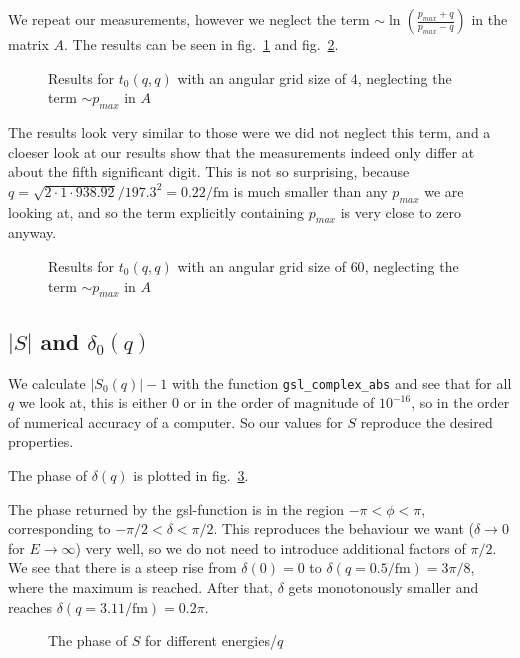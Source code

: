\documentclass{scrartcl}
\begin{document}
We repeat our measurements, however we neglect the term $\sim \ln\left(\frac{p_{max}+q}{p_{max}-q}\right)$ in the matrix $A$. The results can be seen in fig.~\ref{fig:tnnsmallangsizewopm} and fig.~\ref{fig:tnnbigangsizewopm}. 

\begin{figure}[htbp]
	
	\caption{Results for $t_0(q,q)$ with an angular grid size of $4$, neglecting the term $\sim p_{max}$ in $A$}
	\label{fig:tnnsmallangsizewopm}
\end{figure}

The results look very similar to those were we did not neglect this term, and a cloeser look at our results show that the measurements indeed only differ at about the fifth significant digit. This is not so surprising, because $q=\sqrt{2\cdot1\cdot 938.92}/197.3^2=0.22\si{\per\femto\meter}$ is much smaller than any $p_{max}$ we are looking at, and so the term explicitly containing $p_{max}$ is very close to zero anyway.

\begin{figure}[htbp]
	
	\caption{Results for $t_0(q,q)$ with an angular grid size of $60$, neglecting the term $\sim p_{max}$ in $A$}
	\label{fig:tnnbigangsizewopm}
\end{figure}

\subsection{$|S|$ and $\delta_0(q)$}
We calculate $|S_0(q)|-1$ with the function \texttt{gsl\_complex\_abs} and see that for all $q$ we look at, this is either 0 or in the order of magnitude of $10^{-16}$, so in the order of numerical accuracy of a computer. So our values for $S$ reproduce the desired properties. 

The phase of $\delta(q)$ is plotted in fig.~\ref{fig:delta}.

The phase returned by the gsl-function is in the region $-\pi<\phi<\pi$, corresponding to $-\pi/2<\delta<\pi/2$. This reproduces the behaviour we want ($\delta\to 0$ for $E\to\infty$) very well, so we do not need to introduce additional factors of $\pi/2$. We see that there is a steep rise from $\delta(0)=0$ to $\delta(q=0.5\si{\per\femto\meter})=3\pi/8$, where the maximum is reached. After that, $\delta$ gets monotonously smaller and reaches $\delta(q=3.11\si{\per\femto\meter})=0.2\pi$.

\begin{figure}[htbp]
	
	\caption{The phase of $S$ for different energies/$q$}
	\label{fig:delta}
\end{figure}
\end{document}
